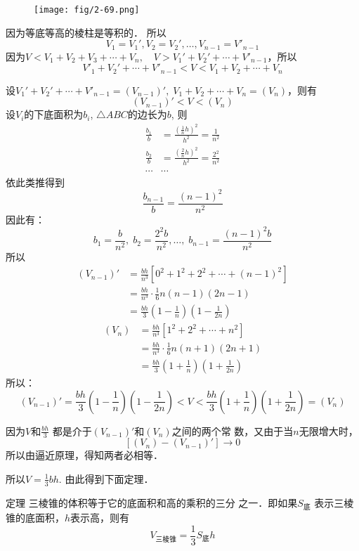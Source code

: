 \begin{figure}[htp]
    \centering
\texttt{[image: fig/2-69.png]}
    \caption{}
\end{figure}


因为等底等高的棱柱是等积的．
所以
\[V_1=V_1',V_2=V_2',\ldots, V_{n-1}=V'_{n-1}\]
因为$V<V_1+V_2+V_3+\cdots+V_n,\quad V>V_1'+V_2'+\cdots+V'_{n-1}$，所以\[V'_1+V_2'+\cdots+V'_{n-1}<V<V_1+V_2+\cdots+V_n\]

设$V_1'+V_2'+\cdots+V'_{n-1}=(V_{n-1})',\; V_1+V_2+\cdots+V_n=(V_n)$，则有
\[(V_{n-1})'<V<(V_n)\]
设$V_i$的下底面积为$b_i$, $\triangle ABC$的边长为$b$, 则
\[\begin{split}
    \frac{b_1}{b}&=\frac{\left(\frac{1}{n}h\right)^2}{h^2}=\frac{1}{n^2}\\
    \frac{b_2}{b}&=\frac{\left(\frac{2}{n}h\right)^2}{h^2}=\frac{2^2}{n^2}\\
\cdots&\cdots
\end{split}\]
依此类推得到
\[\frac{b_{n-1}}{b}=\frac{(n-1)^2}{n^2}\]
因此有：
\[b_1=\frac{b}{n^2},\; b_2=\frac{2^2 b}{n^2},\ldots, \; b_{n-1}=\frac{(n-1)^2 b}{n^2}\]
所以
\[\begin{split}
    (V_{n-1})'&=\frac{bh}{n^3}\left[0^2+1^2+2^2+\cdots+(n-1)^2\right]\\
    &=\frac{bh}{n^3}\cdot \frac{1}{6}n(n-1)(2n-1)\\
    &=\frac{bh}{3}\left(1-\frac{1}{n}\right)\left(1-\frac{1}{2n}\right)
\end{split} \]
\[\begin{split}
    (V_{n})&=\frac{bh}{n^3}\left[1^2+2^2+\cdots+n^2\right]\\
    &=\frac{bh}{n^3}\cdot \frac{1}{6}n(n+1)(2n+1)\\
    &=\frac{bh}{3}\left(1+\frac{1}{n}\right)\left(1+\frac{1}{2n}\right)
\end{split} \]
所以：
\[ (V_{n-1})'=\frac{bh}{3}\left(1-\frac{1}{n}\right)\left(1-\frac{1}{2n}\right)<V<\frac{bh}{3}\left(1+\frac{1}{n}\right)\left(1+\frac{1}{2n}\right)=(V_{n})\]

因为$V$和$\frac{bh}{3}$
都是介于$(V_{n-1})'$和$(V_n)$之间的两个常
数，又由于当$n$无限增大时，
\[[(V_n)-(V_{n-1})'] \to 0\]
所以由逼近原理，得知两者必相等．

所以$V=\frac{1}{3}bh$. 由此得到下面定理．

\begin{blk}
    {定理} 三棱锥的体积等于它的底面积和高的乘积的三分
之一．即如果$S_{\text{底}}$ 表示三棱锥的底面积，$h$表示高，则有
\[V_{\text{三棱锥}}=\frac{1}{3}S_{\text{底}}h\]
\end{blk}

